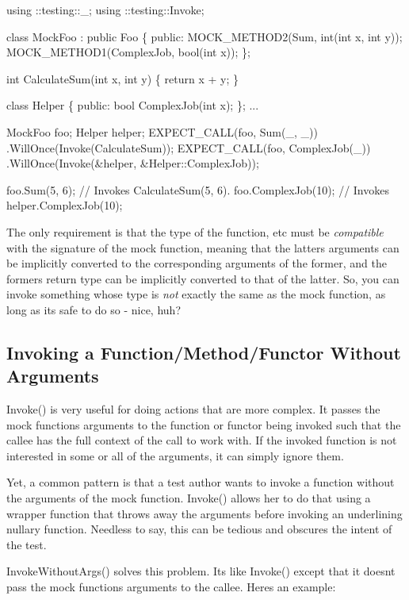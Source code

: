 \begin{DoxyCode}
using ::testing::\_;
using ::testing::Invoke;

class MockFoo : public Foo \{
 public:
  MOCK\_METHOD2(Sum, int(int x, int y));
  MOCK\_METHOD1(ComplexJob, bool(int x));
\};

int CalculateSum(int x, int y) \{ return x + y; \}

class Helper \{
 public:
  bool ComplexJob(int x);
\};
...

  MockFoo foo;
  Helper helper;
  EXPECT\_CALL(foo, Sum(\_, \_))
      .WillOnce(Invoke(CalculateSum));
  EXPECT\_CALL(foo, ComplexJob(\_))
      .WillOnce(Invoke(&helper, &Helper::ComplexJob));

  foo.Sum(5, 6);       // Invokes CalculateSum(5, 6).
  foo.ComplexJob(10);  // Invokes helper.ComplexJob(10);
\end{DoxyCode}


The only requirement is that the type of the function, etc must be {\itshape compatible} with the signature of the mock function, meaning that the latter\textquotesingle{}s arguments can be implicitly converted to the corresponding arguments of the former, and the former\textquotesingle{}s return type can be implicitly converted to that of the latter. So, you can invoke something whose type is {\itshape not} exactly the same as the mock function, as long as it\textquotesingle{}s safe to do so -\/ nice, huh?

\subsection*{Invoking a Function/\+Method/\+Functor Without Arguments}

{\ttfamily Invoke()} is very useful for doing actions that are more complex. It passes the mock function\textquotesingle{}s arguments to the function or functor being invoked such that the callee has the full context of the call to work with. If the invoked function is not interested in some or all of the arguments, it can simply ignore them.

Yet, a common pattern is that a test author wants to invoke a function without the arguments of the mock function. {\ttfamily Invoke()} allows her to do that using a wrapper function that throws away the arguments before invoking an underlining nullary function. Needless to say, this can be tedious and obscures the intent of the test.

{\ttfamily Invoke\+Without\+Args()} solves this problem. It\textquotesingle{}s like {\ttfamily Invoke()} except that it doesn\textquotesingle{}t pass the mock function\textquotesingle{}s arguments to the callee. Here\textquotesingle{}s an example\+:


